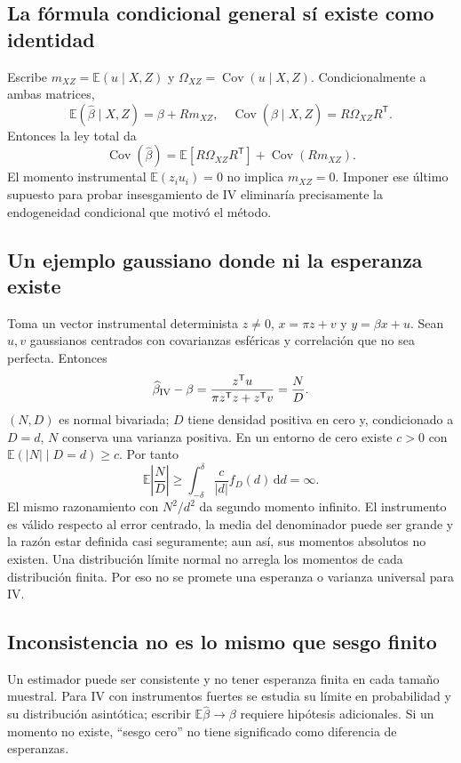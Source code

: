\documentclass[11pt,a4paper]{article}
\newcommand{\E}{\mathbb E}
\newcommand{\dd}{\,\mathrm d}
\newcommand{\T}{^{\mathsf T}}
\DeclareMathOperator{\Cov}{Cov}
\theoremstyle{definition}
\begin{document}
\subsection{La fórmula condicional general sí existe como identidad}
Escribe $m_{XZ}=\E(u\mid X,Z)$ y $\Omega_{XZ}=\Cov(u\mid X,Z)$. Condicionalmente a ambas matrices,
\[
\E(\widehat\beta\mid X,Z)=\beta+Rm_{XZ},\quad
\Cov(\widehat\beta\mid X,Z)=R\Omega_{XZ}R\T.
\]
Entonces la ley total da
\[
\Cov(\widehat\beta)=\E[R\Omega_{XZ}R\T]+\Cov(Rm_{XZ}).
\]
El momento instrumental $\E(z_iu_i)=0$ no implica $m_{XZ}=0$. Imponer ese último supuesto para probar insesgamiento de IV eliminaría precisamente la endogeneidad condicional que motivó el método.
\subsection{Un ejemplo gaussiano donde ni la esperanza existe}
Toma un vector instrumental determinista $z\ne0$, $x=\pi z+v$ y $y=\beta x+u$. Sean $u,v$ gaussianos centrados con covarianzas esféricas y correlación que no sea perfecta. Entonces
\[
\widehat\beta_{\rm IV}-\beta=\frac{z\T u}{\pi z\T z+z\T v}=\frac ND.
\]
$(N,D)$ es normal bivariada; $D$ tiene densidad positiva en cero y, condicionado a $D=d$, $N$ conserva una varianza positiva. En un entorno de cero existe $c>0$ con $\E(|N|\mid D=d)\ge c$. Por tanto
\[
\E\left|\frac ND\right|
\ge\int_{-\delta}^{\delta}\frac c{|d|}f_D(d)\dd d=\infty.
\]
El mismo razonamiento con $N^2/d^2$ da segundo momento infinito. El instrumento es válido respecto al error centrado, la media del denominador puede ser grande y la razón estar definida casi seguramente; aun así, sus momentos absolutos no existen. Una distribución límite normal no arregla los momentos de cada distribución finita. Por eso no se promete una esperanza o varianza universal para IV.
\subsection{Inconsistencia no es lo mismo que sesgo finito}
Un estimador puede ser consistente y no tener esperanza finita en cada tamaño muestral. Para IV con instrumentos fuertes se estudia su límite en probabilidad y su distribución asintótica; escribir $\E\widehat\beta\to\beta$ requiere hipótesis adicionales. Si un momento no existe, ``sesgo cero'' no tiene significado como diferencia de esperanzas.
\end{document}
